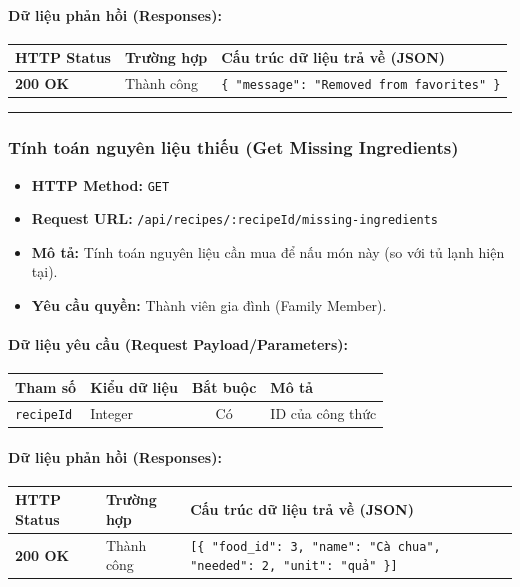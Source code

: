 \documentclass[12pt,a4paper]{article}
\begin{document}
\paragraph{Dữ liệu phản hồi (Responses):}
\begin{longtable}{|>{\raggedright\arraybackslash}p{2.8cm}|>{\raggedright\arraybackslash}p{3.2cm}|>{\raggedright\arraybackslash}p{8.0cm}|}
\hline
\textbf{HTTP Status} & \textbf{Trường hợp} & \textbf{Cấu trúc dữ liệu trả về (JSON)} \\ \hline
\endhead
\textbf{200 OK} & Thành công & \texttt{\{ "message": "Removed from favorites" \}} \\ \hline
\end{longtable}

\vskip 0.4cm
\noindent\rule{\textwidth}{0.3pt}
\vskip 0.4cm

\subsubsection{Tính toán nguyên liệu thiếu (Get Missing Ingredients)}
\begin{itemize}[leftmargin=*]
    \item \textbf{HTTP Method:} \texttt{GET}
    \item \textbf{Request URL:} \texttt{/api/recipes/:recipeId/missing-ingredients}
    \item \textbf{Mô tả:} Tính toán nguyên liệu cần mua để nấu món này (so với tủ lạnh hiện tại).
    \item \textbf{Yêu cầu quyền:} Thành viên gia đình (Family Member).
\end{itemize}

\paragraph{Dữ liệu yêu cầu (Request Payload/Parameters):}
\begin{longtable}{|>{\raggedright\arraybackslash}p{2.8cm}|>{\raggedright\arraybackslash}p{2.2cm}|c|>{\raggedright\arraybackslash}p{7.0cm}|}
\hline
\textbf{Tham số} & \textbf{Kiểu dữ liệu} & \textbf{Bắt buộc} & \textbf{Mô tả} \\ \hline
\endhead
\texttt{recipeId} & Integer & Có & ID của công thức \\ \hline
\end{longtable}

\paragraph{Dữ liệu phản hồi (Responses):}
\begin{longtable}{|>{\raggedright\arraybackslash}p{2.8cm}|>{\raggedright\arraybackslash}p{3.2cm}|>{\raggedright\arraybackslash}p{8.0cm}|}
\hline
\textbf{HTTP Status} & \textbf{Trường hợp} & \textbf{Cấu trúc dữ liệu trả về (JSON)} \\ \hline
\endhead
\textbf{200 OK} & Thành công & \texttt{[\{ "food\_id": 3, "name": "Cà chua", "needed": 2, "unit": "quả" \}]} \\ \hline
\end{longtable}
\end{document}
